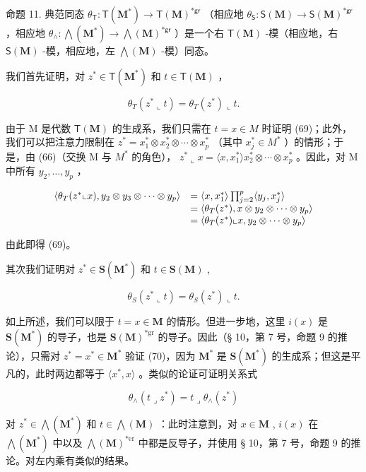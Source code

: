 命题 11. 典范同态 \(\theta_{\mathsf{T}}: \mathsf{T}(\mathbf{M}^{*}) \to \mathsf{T}(\mathbf{M})^{*\mathsf{gr}}\) （相应地 \(\theta_{\mathsf{S}}: \mathsf{S}(\mathbf{M}) \to \mathsf{S}(\mathbf{M})^{*\mathsf{gr}}\) ，相应地 \(\theta_{\wedge}: \bigwedge (\mathbf{M}^{*}) \to \bigwedge (\mathbf{M})^{*\mathsf{gr}}\) ）是一个右 \(\mathsf{T}(\mathbf{M})\) -模（相应地，右 \(\mathsf{S}(\mathbf{M})\) -模，相应地，左 \(\bigwedge (\mathbf{M})\) -模）同态。

我们首先证明，对 \(z^{*} \in \mathsf{T}(\mathbf{M}^{*})\) 和 \(t \in \mathsf{T}(\mathbf{M})\) ，

\[
\theta_ {T} (z ^ {*} \llcorner t) = \theta_ {T} (z ^ {*}) \llcorner t.\tag{69}
\]

由于 M 是代数 \(\mathsf{T}(\mathbf{M})\) 的生成系，我们只需在 \(t = x \in M\) 时证明 (69)；此外，我们可以把注意力限制在 \(z^{*} = x_{1}^{*} \otimes x_{2}^{*} \otimes \cdots \otimes x_{p}^{*}\) （其中 \(x_{j}^{*} \in M^{*}\) ）的情形；于是，由 (66)（交换 M 与 \(M^{*}\) 的角色）， \(z^{*} \llcorner x = \langle x, x_{1}^{*} \rangle x_{2}^{*} \otimes \cdots \otimes x_{p}^{*}\) 。因此，对 M 中所有 \(y_{2}, \ldots, y_{p}\) ，

\[
\begin{array}{r l} \langle \theta_ {T} (z ^ {*} \llcorner x), y _ {2} \otimes y _ {3} \otimes \dots \otimes y _ {p} \rangle & = \langle x, x _ {1} ^ {*} \rangle \prod_ {j = 2} ^ {p} \langle y _ {j}, x _ {j} ^ {*} \rangle \\ & = \langle \theta_ {T} (z ^ {*}), x \otimes y _ {2} \otimes \dots \otimes y _ {p} \rangle \\ & = \langle \theta_ {T} (z ^ {*}) \llcorner x, y _ {2} \otimes \dots \otimes y _ {p} \rangle \end{array}
\]

由此即得 (69)。

其次我们证明对 \(z^{*} \in \mathbf{S}(\mathbf{M}^{*})\) 和 \(t \in \mathbf{S}(\mathbf{M})\) ,

\[
\theta_ {S} (z ^ {*} \llcorner t) = \theta_ {S} (z ^ {*}) \llcorner t.\tag{70}
\]

如上所述，我们可以限于 \(t = x \in \mathbf{M}\) 的情形。但进一步地，这里 \(i(x)\) 是 \(\mathbf{S}(\mathbf{M}^*)\) 的导子，也是 \(\mathbf{S}(\mathbf{M})^{*\text{gr}}\) 的导子。因此（§ 10，第 7 号，命题 9 的推论），只需对 \(z^* = x^* \in \mathbf{M}^*\) 验证 (70)，因为 \(\mathbf{M}^*\) 是 \(\mathbf{S}(\mathbf{M}^*)\) 的生成系；但这是平凡的，此时两边都等于 \(\langle x^*, x \rangle\) 。类似的论证可证明关系式

\[
\theta_ {\wedge} (t \lrcorner z ^ {*}) = t \lrcorner \theta_ {\wedge} (z ^ {*})\tag{71}
\]

对 \(z^{*} \in \bigwedge(\mathbf{M}^{*})\) 和 \(t \in \bigwedge(\mathbf{M})\) ：此时注意到，对 \(x \in \mathbf{M}\) , \(i(x)\) 在 \(\bigwedge(\mathbf{M}^{*})\) 中以及 \(\bigwedge(\mathbf{M})^{*\text{er}}\) 中都是反导子，并使用 § 10，第 7 号，命题 9 的推论。对左内乘有类似的结果。

